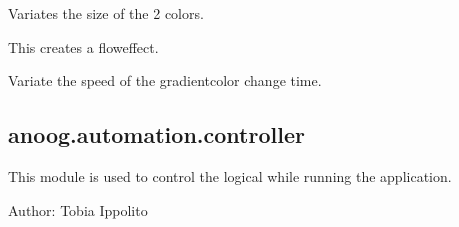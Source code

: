 \documentclass[letterpaper,10pt,english]{sphinxmanual}
\begin{document}
\begin{fulllineitems}
\begin{fulllineitems}
\end{fulllineitems}


\begin{fulllineitems}
\label{\detokenize{anoog.automation:anoog.automation.bg_booster.Color_Gradient_Booster.variate_gradient_size}}
\sphinxAtStartPar
Variates the size of the 2 colors.

\sphinxAtStartPar
This creates a flow\sphinxhyphen{}effect.

\end{fulllineitems}


\begin{fulllineitems}
\label{\detokenize{anoog.automation:anoog.automation.bg_booster.Color_Gradient_Booster.variate_gradient_size_speed}}
\sphinxAtStartPar
Variate the speed of the gradient\sphinxhyphen{}color change time.

\end{fulllineitems}


\end{fulllineitems}



\subsection{anoog.automation.controller}
\label{\detokenize{anoog.automation:module-anoog.automation.controller}}\label{\detokenize{anoog.automation:anoog-automation-controller}}
\sphinxAtStartPar
This module is used to control the logical while running the application.

\sphinxAtStartPar
Author: Tobia Ippolito
\end{document}
